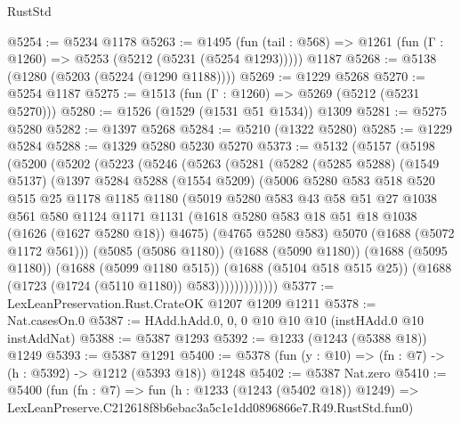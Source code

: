 \begin{lexlean}{RustStd}
\begin{coremodule}
@5254 := @5234 @1178
@5263 := @1495
    (fun (tail : @568) => @1261 (fun (Γ : @1260) => @5253 (@5212 (@5231 (@5254 @1293)))))
    @1187
@5268 := @5138 (@1280 (@5203 (@5224 (@1290 @1188))))
@5269 := @1229 @5268
@5270 := @5254 @1187
@5275 := @1513 (fun (Γ : @1260) => @5269 (@5212 (@5231 @5270)))
@5280 := @1526 (@1529 (@1531 @51 @1534)) @1309
@5281 := @5275 @5280
@5282 := @1397 @5268
@5284 := @5210 (@1322 @5280)
@5285 := @1229 @5284
@5288 := @1329 @5280 @5230 @5270
@5373 := @5132
    (@5157
      (@5198
        (@5200
          (@5202
            (@5223
              (@5246
                (@5263
                  (@5281
                    (@5282
                      (@5285 @5288)
                      (@1549 @5137)
                      (@1397
                        @5284
                        @5288
                        (@1554 @5209)
                        (@5006
                          @5280
                          @583
                          @518
                          @520
                          @515
                          @25
                          @1178
                          @1185
                          @1180
                          (@5019
                            @5280
                            @583
                            @43
                            @58
                            @51
                            @27
                            @1038
                            @561
                            @580
                            @1124
                            @1171
                            @1131
                            (@1618 @5280 @583 @18 @51 @18 @1038 (@1626 (@1627 @5280 @18)) @4675)
                            (@4765 @5280 @583)
                            @5070
                            (@1688 (@5072 @1172 @561)))
                          (@5085 (@5086 @1180))
                          (@1688 (@5090 @1180))
                          (@1688 (@5095 @1180))
                          (@1688 (@5099 @1180 @515))
                          (@1688 (@5104 @518 @515 @25))
                          (@1688 (@1723 (@1724 (@5110 @1180)) @583)))))))))))))
@5377 := LexLeanPreservation.Rust.CrateOK @1207 @1209 @1211
@5378 := Nat.casesOn.{0}
@5387 := HAdd.hAdd.{0, 0, 0} @10 @10 @10 (instHAdd.{0} @10 instAddNat)
@5388 := @5387 @1293
@5392 := @1233 (@1243 (@5388 @18)) @1249
@5393 := @5387 @1291
@5400 := @5378 (fun (y : @10) => (fn : @7) -> (h : @5392) -> @1212 (@5393 @18)) @1248
@5402 := @5387 Nat.zero
@5410 := @5400
    (fun (fn : @7) =>
    fun (h : @1233 (@1243 (@5402 @18)) @1249) =>
    LexLeanPreserve.C212618f8b6ebac3a5c1e1dd0896866e7.R49.RustStd.fun0)

\end{coremodule}
\end{lexlean}
